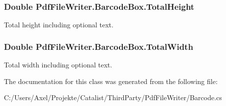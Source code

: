 \subsubsection[{\texorpdfstring{Total\+Height}{TotalHeight}}]{\setlength{\rightskip}{0pt plus 5cm}Double Pdf\+File\+Writer.\+Barcode\+Box.\+Total\+Height}\hypertarget{class_pdf_file_writer_1_1_barcode_box_ab28ba49a22e136caf4373eeed103f98c}{}\label{class_pdf_file_writer_1_1_barcode_box_ab28ba49a22e136caf4373eeed103f98c}


Total height including optional text. 

\subsubsection[{\texorpdfstring{Total\+Width}{TotalWidth}}]{\setlength{\rightskip}{0pt plus 5cm}Double Pdf\+File\+Writer.\+Barcode\+Box.\+Total\+Width}\hypertarget{class_pdf_file_writer_1_1_barcode_box_a6cb4866d8c0b17c7ddfdedd297574def}{}\label{class_pdf_file_writer_1_1_barcode_box_a6cb4866d8c0b17c7ddfdedd297574def}


Total width including optional text. 



The documentation for this class was generated from the following file\+:\begin{DoxyCompactItemize}
\item 
C\+:/\+Users/\+Axel/\+Projekte/\+Catalist/\+Third\+Party/\+Pdf\+File\+Writer/Barcode.\+cs\end{DoxyCompactItemize}
